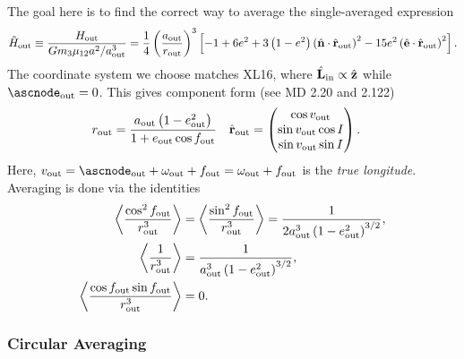 \documentclass[10pt,
        usenames, %
        dvipsnames %
    ]{article}
\newcommand*{\bm}[1]{\boldsymbol{\mathbf{#1}}}
\newcommand*{\uv}[1]{\hat{\bm{#1}}}
\newcommand*{\ev}[1]{\left\langle#1\right\rangle}
\newcommand*{\p}[1]{\left(#1\right)}
\newcommand*{\s}[1]{\left[#1\right]}
\begin{document}
The goal here is to find the correct way to average the single-averaged
expression
\begin{equation}
    \tilde{H}_{\rm out} \equiv \frac{H_{\rm out}}{Gm_3\mu_{12}a^2/a_{\rm out}^3}
        = \frac{1}{4}\p{\frac{a_{\rm out}}{r_{\rm out}}}^3 \s{
            -1 + 6e^2 + 3\p{1 - e^2}\p{\uv{n} \cdot \uv{r}_{\rm out}}^2
            - 15 e^2\p{\uv{e} \cdot \uv{r}_{\rm out}}^2}.
\end{equation}
The coordinate system we choose matches XL16, where $\uv{L}_{\rm in} \propto
\uv{z}$ while $\ascnode_{\rm out} = 0$. This gives component form (see MD 2.20 and
2.122)
\begin{align}
    r_{\rm out} &= \frac{a_{\rm out}\p{1 - e_{\rm out}^2}}{1 + e_{\rm out} \cos
        f_{\rm out}} &
    \uv{r}_{\rm out} &= \begin{pmatrix}
        \cos v_{\rm out}\\
        \sin v_{\rm out} \cos I\\
        \sin v_{\rm out} \sin I
    \end{pmatrix}.
\end{align}
Here, $v_{\rm out} = \ascnode_{\rm out} + \omega_{\rm out} + f_{\rm out} =
\omega_{\rm out} + f_{\rm out}$ is the \emph{true longitude}. Averaging is done
via the identities
\begin{align}
    \ev{\frac{\cos^2 f_{\rm out}}{r_{\rm out}^3}} &=
        \ev{\frac{\sin^2 f_{\rm out}}{r_{\rm out}^3}}
        = \frac{1}{2a_{\rm out}^3\p{1 - e_{\rm out}^2}^{3/2}},\\
    \ev{\frac{1}{r_{\rm out}^3}} &= \frac{1}{a_{\rm out}^3\p{1 - e_{\rm
        out}^2}^{3/2}},\\
    \ev{\frac{\cos f_{\rm out} \sin f_{\rm out}}{r_{\rm out}^3}} &= 0.
\end{align}

\subsubsection{Circular Averaging}
\end{document}
